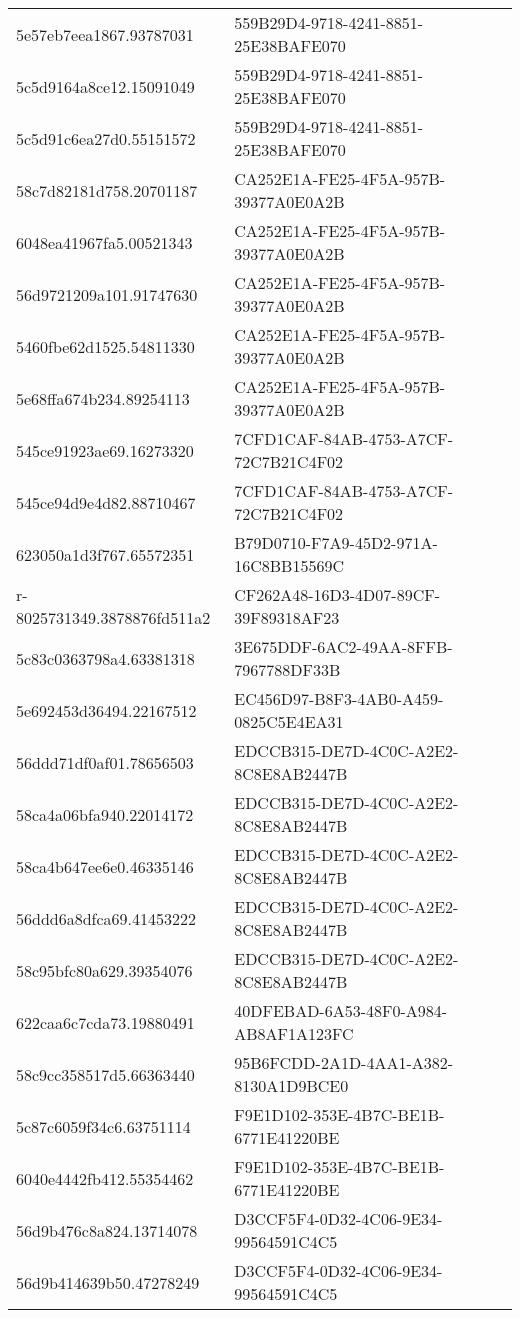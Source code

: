 \begin{tabular}{ll}
5e57eb7eea1867.93787031 & 559B29D4-9718-4241-8851-25E38BAFE070 \\
5c5d9164a8ce12.15091049 & 559B29D4-9718-4241-8851-25E38BAFE070 \\
5c5d91c6ea27d0.55151572 & 559B29D4-9718-4241-8851-25E38BAFE070 \\
58c7d82181d758.20701187 & CA252E1A-FE25-4F5A-957B-39377A0E0A2B \\
6048ea41967fa5.00521343 & CA252E1A-FE25-4F5A-957B-39377A0E0A2B \\
56d9721209a101.91747630 & CA252E1A-FE25-4F5A-957B-39377A0E0A2B \\
5460fbe62d1525.54811330 & CA252E1A-FE25-4F5A-957B-39377A0E0A2B \\
5e68ffa674b234.89254113 & CA252E1A-FE25-4F5A-957B-39377A0E0A2B \\
545ce91923ae69.16273320 & 7CFD1CAF-84AB-4753-A7CF-72C7B21C4F02 \\
545ce94d9e4d82.88710467 & 7CFD1CAF-84AB-4753-A7CF-72C7B21C4F02 \\
623050a1d3f767.65572351 & B79D0710-F7A9-45D2-971A-16C8BB15569C \\
r-8025731349.3878876fd511a2 & CF262A48-16D3-4D07-89CF-39F89318AF23 \\
5c83c0363798a4.63381318 & 3E675DDF-6AC2-49AA-8FFB-7967788DF33B \\
5e692453d36494.22167512 & EC456D97-B8F3-4AB0-A459-0825C5E4EA31 \\
56ddd71df0af01.78656503 & EDCCB315-DE7D-4C0C-A2E2-8C8E8AB2447B \\
58ca4a06bfa940.22014172 & EDCCB315-DE7D-4C0C-A2E2-8C8E8AB2447B \\
58ca4b647ee6e0.46335146 & EDCCB315-DE7D-4C0C-A2E2-8C8E8AB2447B \\
56ddd6a8dfca69.41453222 & EDCCB315-DE7D-4C0C-A2E2-8C8E8AB2447B \\
58c95bfc80a629.39354076 & EDCCB315-DE7D-4C0C-A2E2-8C8E8AB2447B \\
622caa6c7cda73.19880491 & 40DFEBAD-6A53-48F0-A984-AB8AF1A123FC \\
58c9cc358517d5.66363440 & 95B6FCDD-2A1D-4AA1-A382-8130A1D9BCE0 \\
5c87c6059f34c6.63751114 & F9E1D102-353E-4B7C-BE1B-6771E41220BE \\
6040e4442fb412.55354462 & F9E1D102-353E-4B7C-BE1B-6771E41220BE \\
56d9b476c8a824.13714078 & D3CCF5F4-0D32-4C06-9E34-99564591C4C5 \\
56d9b414639b50.47278249 & D3CCF5F4-0D32-4C06-9E34-99564591C4C5 \\

\end{tabular}
